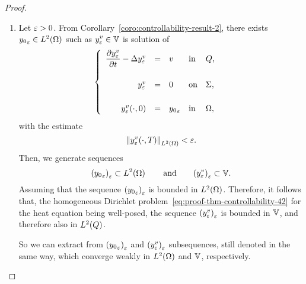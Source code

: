 \begin{proof}%
    \begin{enumerate}
        \item Let $\varepsilon > 0$. From
            Corollary~\ref{coro:controllability-result-2}, there exists
            ${y_{0}}_{\varepsilon}\in L^{2}\!\left({\Omega}\right)$ such as $\displaystyle
            y_{\varepsilon}^{v}\in \mathbb{V}$ is solution of
            \begin{equation}\label{eq:proof-thm-controllability-42}
                \begin{cases}\displaystyle
                    \begin{array}{rclll}
                        \dfrac{\partial{}y_{\varepsilon}^{v}}{\partial{}t} - \Delta y_{\varepsilon}^{v} &
                        = & v & \text{in} & Q,\\
                        \\
                        y_{\varepsilon}^{v} & = & 0 & \text{on} & \Sigma,\\
                        \\
                        y_{\varepsilon}^{v}\!\left({\cdot,0}\right) & = &
                        {y_{0}}_{\varepsilon} & \text{in} & \Omega,
                    \end{array}
                \end{cases}
            \end{equation}
            with the estimate
            \begin{equation*}\label{eq:proof-thm-controllability-43}
                {\left\|{y_{\varepsilon}^{v}\!\left({\cdot, T}\right) }\right\|}_{L^{2}\left({\Omega}\right)} < \varepsilon.
            \end{equation*}
            Then, we generate sequences
            \begin{equation*}
                {\left({{y_{0}}_{\varepsilon}}\right)}_{\varepsilon}\subset
                L^{2}\!\left({\Omega}\right)\qquad\text{and}\qquad
                {\left({y_{\varepsilon}^{v}}\right)}_{\varepsilon}\subset \mathbb{V}.
            \end{equation*}
            Assuming that the sequence
            ${\left({{y_{0}}_{\varepsilon}}\right)}_{\varepsilon}$ is bounded in
            $L^{2}\!\left({\Omega}\right)$. Therefore, it follows that, the homogeneous
            Dirichlet problem~\eqref{eq:proof-thm-controllability-42} for
            the heat equation being well-posed, the sequence
            ${\left({y_{\varepsilon}^{v}}\right)}_{\varepsilon}$ is bounded in $\mathbb{V}$,
            and therefore also in $L^{2}\!\left({Q}\right)$.

            So we can extract from
            ${\left({{y_{0}}_{\varepsilon}}\right)}_{\varepsilon}$ and
            ${\left({y_{\varepsilon}^{v}}\right)}_{\varepsilon}$ subsequences, still
            denoted in the same way, which converge weakly in
            $L^{2}\!\left({\Omega}\right)$ and $\mathbb{V}$, respectively.


\end{enumerate}
\end{proof}
